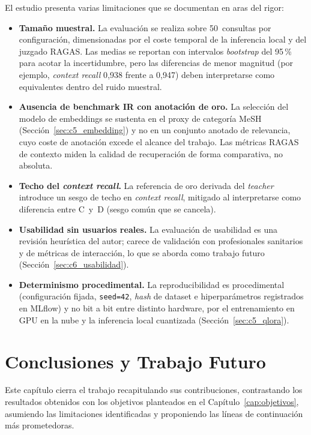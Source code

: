 \documentclass[11pt,a4paper,spanish]{book}
\numberwithin{equation}{chapter}
\numberwithin{figure}{chapter}
\begin{document}
El estudio presenta varias limitaciones que se documentan en aras del rigor:

\begin{itemize}
  \item \textbf{Tamaño muestral.} La evaluación se realiza sobre 50~consultas por configuración, dimensionadas por el coste temporal de la inferencia local y del juzgado RAGAS. Las medias se reportan con intervalos \textit{bootstrap} del 95\,\% para acotar la incertidumbre, pero las diferencias de menor magnitud (por ejemplo, \textit{context recall} 0{,}938 frente a 0{,}947) deben interpretarse como equivalentes dentro del ruido muestral.
  \item \textbf{Ausencia de benchmark IR con anotación de oro.} La selección del modelo de embeddings se sustenta en el proxy de categoría MeSH (Sección~\ref{sec:c5_embedding}) y no en un conjunto anotado de relevancia, cuyo coste de anotación excede el alcance del trabajo. Las métricas RAGAS de contexto miden la calidad de recuperación de forma comparativa, no absoluta.
  \item \textbf{Techo del \textit{context recall}.} La referencia de oro derivada del \textit{teacher} introduce un sesgo de techo en \textit{context recall}, mitigado al interpretarse como diferencia entre C~y~D (sesgo común que se cancela).
  \item \textbf{Usabilidad sin usuarios reales.} La evaluación de usabilidad es una revisión heurística del autor; carece de validación con profesionales sanitarios y de métricas de interacción, lo que se aborda como trabajo futuro (Sección~\ref{sec:c6_usabilidad}).
  \item \textbf{Determinismo procedimental.} La reproducibilidad es procedimental (configuración fijada, \texttt{seed=42}, \textit{hash} de dataset e hiperparámetros registrados en MLflow) y no bit a bit entre distinto hardware, por el entrenamiento en GPU en la nube y la inferencia local cuantizada (Sección~\ref{sec:c5_qlora}).
\end{itemize}

\chapter{Conclusiones y Trabajo Futuro}
\label{cap:conclusiones}

Este capítulo cierra el trabajo recapitulando sus contribuciones, contrastando los resultados obtenidos con los objetivos planteados en el Capítulo~\ref{cap:objetivos}, asumiendo las limitaciones identificadas y proponiendo las líneas de continuación más prometedoras.
\end{document}
